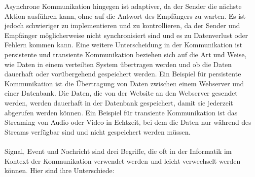 \documentclass[../vs-script-first-v01.tex]{subfiles}
\begin{document}
Asynchrone Kommunikation hingegen ist adaptiver, da der Sender die nächste Aktion ausführen kann, ohne auf die Antwort des Empfängers zu warten. Es ist jedoch schwieriger zu implementieren und zu kontrollieren, da der Sender und Empfänger möglicherweise nicht synchronisiert sind und es zu Datenverlust oder Fehlern kommen kann. 
Eine weitere Unterscheidung in der Kommunikation ist persistente und transiente Kommunikation beziehen sich auf die Art und Weise, wie Daten in einem verteilten System übertragen werden und ob die Daten dauerhaft oder vorübergehend gespeichert werden.
Ein Beispiel für persistente Kommunikation ist die Übertragung von Daten zwischen einem Webserver und einer Datenbank. Die Daten, die von der Website an den Webserver gesendet werden, werden dauerhaft in der Datenbank gespeichert, damit sie jederzeit abgerufen werden können. Ein Beispiel für transiente Kommunikation ist das Streaming von Audio oder Video in Echtzeit, bei dem die Daten nur während des Streams verfügbar sind und nicht gespeichert werden müssen.
\\\\
Signal, Event und Nachricht sind drei Begriffe, die oft in der Informatik im Kontext der Kommunikation verwendet werden und leicht verwechselt werden können. Hier sind ihre Unterschiede:
\end{document}
